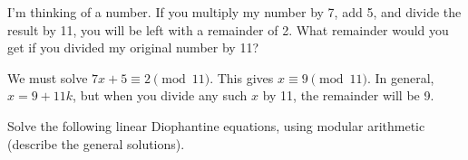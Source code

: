 \begin{questions}

	\begin{answer}
	\end{answer}
	
	


\question I'm thinking of a number.  If you multiply my number by 7, add 5, and divide the result by 11, you will be left with a remainder of 2.  What remainder would you get if you divided my original number by 11?

	\begin{answer}
		We must solve $7x + 5 \equiv 2 \pmod{11}$.  This gives $x \equiv 9 \pmod{11}$.  In general, $x = 9 + 11k$, but when you divide any such $x$ by 11, the remainder will be 9.
	\end{answer}	
	
	
	
	


\question Solve the following linear Diophantine equations, using modular arithmetic (describe the general solutions).
\begin{parts}

\end{parts}
\end{questions}
